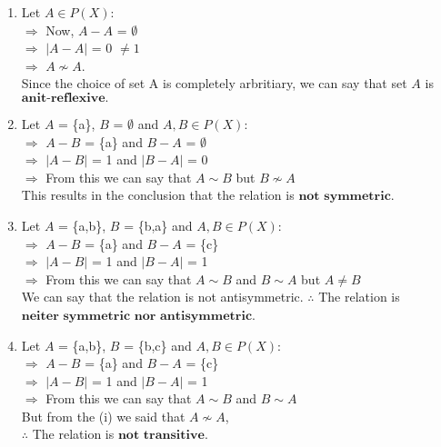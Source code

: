 \documentclass{article}
\begin{document}
\begin{enumerate}
\begin{multicols}{2}
\begin{enumerate}
\begin{enumerate}
            \item Let $A \in P(X)$:\\
                $\Rightarrow$ Now, $A - A$ = $\emptyset$\\
                $\Rightarrow$ $\left\lvert A - A\right\rvert$ = 0 $\neq 1$\\
                $\Rightarrow$ $A \nsim A$.\\
                Since the choice of set A is completely arbritiary, we can say that set $A$ is 
                $\textbf{anit-reflexive.}$\\

            \item Let $A$ = \{a\}, $B$ = $\emptyset$ and $A,B \in P(X)$:\\
                $\Rightarrow$ $A-B$ = \{a\} and $B-A$ = $\emptyset$\\
                $\Rightarrow$ $\left\lvert A - B\right\rvert$ = 1 and $\left\lvert B - A\right\rvert$ = 0\\
                $\Rightarrow$ From this we can say that $A \sim B$ but $B \nsim A$\\
                This results in the conclusion that the relation is $\textbf{not symmetric}$.\\

            \item Let $A$ = \{a,b\}, $B$ = \{b,a\} and $A,B \in P(X)$:\\
                $\Rightarrow$ $A-B$ = \{a\} and $B-A$ = \{c\} \\
                $\Rightarrow$ $\left\lvert A - B\right\rvert$ = 1 and $\left\lvert B - A\right\rvert$ = 1\\
                $\Rightarrow$ From this we can say that $A \sim B$ and $B \sim A$ but $A \neq B$\\
                We can say that the relation is not antisymmetric. $\therefore$ The relation is 
                $\textbf{neiter symmetric nor antisymmetric}$.\\

            \item Let $A$ = \{a,b\}, $B$ = \{b,c\} and $A,B \in P(X)$:\\
                $\Rightarrow$ $A-B$ = \{a\} and $B-A$ = \{c\} \\
                $\Rightarrow$ $\left\lvert A - B\right\rvert$ = 1 and $\left\lvert B - A\right\rvert$ = 1\\
                $\Rightarrow$ From this we can say that $A \sim B$ and $B \sim A$\\
                But from the (i) we said that $A \nsim A$,\\ $\therefore$ The relation is $\textbf{not transitive}$.
        \end{enumerate}


\end{enumerate}
\end{multicols}
\end{enumerate}
\end{document}
